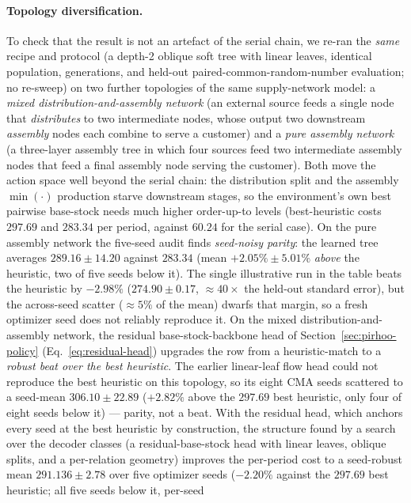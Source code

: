 \documentclass[11pt]{article}
\begin{document}
\paragraph{Topology diversification.}
To check that the result is not an artefact of the serial chain, we re-ran the \emph{same} recipe and
protocol (a depth-2 oblique soft tree with linear leaves, identical population, generations, and
held-out paired-common-random-number evaluation; no re-sweep) on two further topologies of the same
supply-network model: a \emph{mixed distribution-and-assembly network} (an external source feeds a
single node that \emph{distributes} to two intermediate nodes, whose output two downstream
\emph{assembly} nodes each combine to serve a customer) and a \emph{pure assembly network} (a
three-layer assembly tree in which four sources feed two intermediate assembly nodes that feed a final
assembly node serving the customer). Both move the action space well beyond the serial chain: the
distribution split and the assembly $\min(\cdot)$ production starve downstream stages, so the
environment's own best pairwise base-stock needs much higher order-up-to levels (best-heuristic costs $297.69$ and
$283.34$ per period, against $60.24$ for the serial case). On the pure assembly network the five-seed
audit finds \emph{seed-noisy parity}: the learned tree averages $289.16\pm14.20$ against $283.34$
(mean $+2.05\%\pm5.01\%$ \emph{above} the heuristic, two of five seeds below it). The single
illustrative run in the table beats the heuristic by $-2.98\%$ ($274.90\pm0.17$, $\approx40\times$
the held-out standard error), but the across-seed scatter ($\approx5\%$ of the mean) dwarfs that
margin, so a fresh optimizer seed does not reliably reproduce it. On the mixed distribution-and-assembly network, the residual base-stock-backbone head of
Section~\ref{sec:pirhoo-policy} (Eq.~\eqref{eq:residual-head}) upgrades the row from a heuristic-match to a
\emph{robust beat over the best heuristic}. The earlier linear-leaf flow head could not reproduce the best heuristic on this topology, so
its eight CMA seeds scattered to a seed-mean $306.10\pm22.89$ ($+2.82\%$ above the $297.69$ best heuristic, only
four of eight seeds below it) --- parity, not a beat. With the residual head, which anchors every seed
at the best heuristic by construction, the structure found by a search over the decoder classes (a
residual-base-stock head with linear leaves, oblique splits, and a per-relation geometry) improves the
per-period cost to a seed-robust mean $291.136\pm2.78$ over five
optimizer seeds ($-2.20\%$ against the $297.69$ best heuristic; all five seeds below it, per-seed
\end{document}
